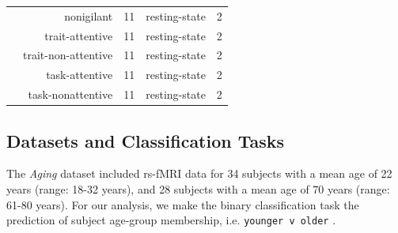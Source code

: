 \documentclass[12pt]{spieman}  %
\newcommand{\code}[1]{\small \texttt{#1} \normalsize}
\begin{document}
\begin{spacing}{2}
\begin{table}[h!]
\begin{tabular}{ l r c c c }
        &  nonigilant         & 11     & resting-state        & 2 \\
        &  trait-attentive     & 11    & resting-state        & 2 \\
        &  trait-non-attentive & 11    & resting-state        & 2 \\
        &  task-attentive     & 11     & resting-state        & 2 \\
        &  task-nonattentive  & 11     & resting-state        & 2 \\
\hline
\end{tabular}
\end{table}



\subsection{Datasets and Classification Tasks}


The \textit{Aging} dataset\cite{wahlheimIntrinsicFunctionalConnectivity2021}
included rs-fMRI data for 34 subjects with a mean age of 22 years (range: 18-32
years), and 28 subjects with a mean age of 70 years (range: 61-80 years). For
our analysis, we make the binary classification task the prediction of subject
age-group membership, i.e. \code{younger v older}.



\end{spacing}
\end{document}
